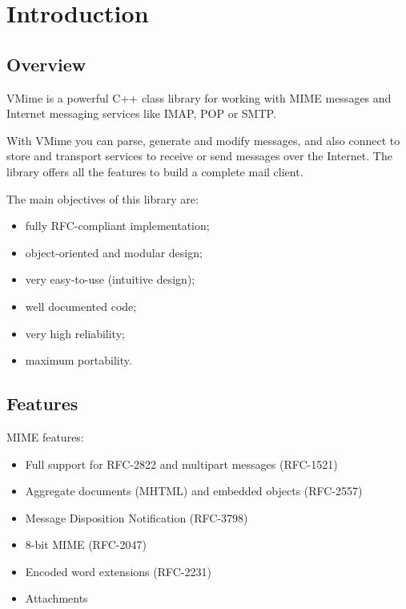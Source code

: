 \chapter{Introduction}

\section{Overview}

VMime is a powerful C++ class library for working with MIME messages and
Internet messaging services like IMAP, POP or SMTP.

With VMime you can parse, generate and modify messages, and also connect to
store and transport services to receive or send messages over the Internet.
The library offers all the features to build a complete mail client.

The main objectives of this library are:

\begin{itemize}
\item fully RFC-compliant implementation;
\item object-oriented and modular design;
\item very easy-to-use (intuitive design);
\item well documented code;
\item very high reliability;
\item maximum portability.
\end{itemize}


\section{Features}

\noindent MIME features:

\begin{itemize}
\item Full support for RFC-2822 and multipart messages (RFC-1521)
\item Aggregate documents (MHTML) and embedded objects (RFC-2557)
\item Message Disposition Notification (RFC-3798)
\item 8-bit MIME (RFC-2047)
\item Encoded word extensions (RFC-2231)
\item Attachments
\end{itemize}

